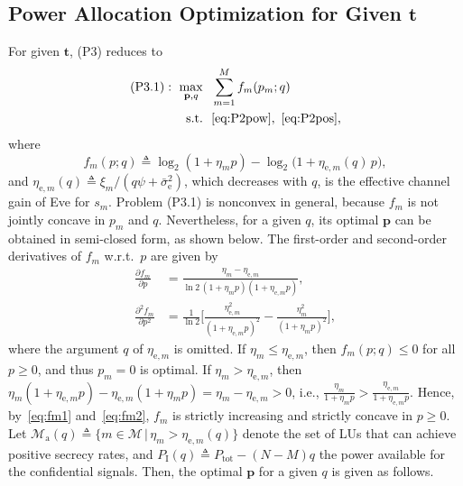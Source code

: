 \documentclass[journal]{IEEEtran}
\newcommand{\bt}{\mathbf{t}}
\newcommand{\bp}{\mathbf{p}}
\newcommand{\Ptot}{P_{\mathrm{tot}}}
\newcommand{\sbe}{\bar{\sigma}_{\mathrm{e}}^2}
\begin{document}
\subsection{Power Allocation Optimization for Given $\bt$}\label{sec:power}

For given $\bt$, (P3) reduces to
\begin{subequations}\label{eq:P31}
\begin{align}
(\mathrm{P3.1}):\ \max_{\bp,q}\ \ & \sum_{m=1}^{M}f_m(p_m;q)\\
\mathrm{s.t.}\ \ & \eqref{eq:P2pow},\ \eqref{eq:P2pos},\nonumber
\end{align}
\end{subequations}
where
\begin{equation}\label{eq:fm}
f_m(p;q)\triangleq\log_2(1+\eta_mp)-\log_2\big(1+\eta_{\mathrm{e},m}(q)\,p\big),
\end{equation}
and $\eta_{\mathrm{e},m}(q)\triangleq\xi_m/(q\psi+\sbe)$, which decreases with $q$, is the effective channel gain of Eve for $s_m$. Problem (P3.1) is nonconvex in general, because $f_m$ is not jointly concave in $p_m$ and $q$. Nevertheless, for a given $q$, its optimal $\bp$ can be obtained in semi-closed form, as shown below. The first-order and second-order derivatives of $f_m$ w.r.t.\ $p$ are given by
\begin{align}
\frac{\partial f_m}{\partial p}&=\frac{\eta_m-\eta_{\mathrm{e},m}}{\ln2\,(1+\eta_mp)(1+\eta_{\mathrm{e},m}p)},\label{eq:fm1}\\
\frac{\partial^2 f_m}{\partial p^2}&=\frac{1}{\ln2}\bigg[\frac{\eta_{\mathrm{e},m}^2}{(1+\eta_{\mathrm{e},m}p)^2}-\frac{\eta_m^2}{(1+\eta_mp)^2}\bigg],\label{eq:fm2}
\end{align}
where the argument $q$ of $\eta_{\mathrm{e},m}$ is omitted. If $\eta_m\le\eta_{\mathrm{e},m}$, then $f_m(p;q)\le0$ for all $p\ge0$, and thus $p_m=0$ is optimal. If $\eta_m>\eta_{\mathrm{e},m}$, then $\eta_m(1+\eta_{\mathrm{e},m}p)-\eta_{\mathrm{e},m}(1+\eta_mp)=\eta_m-\eta_{\mathrm{e},m}>0$, i.e., $\frac{\eta_m}{1+\eta_mp}>\frac{\eta_{\mathrm{e},m}}{1+\eta_{\mathrm{e},m}p}$. Hence, by~\eqref{eq:fm1} and~\eqref{eq:fm2}, $f_m$ is strictly increasing and strictly concave in $p\ge0$. Let $\mathcal M_{\mathrm a}(q)\triangleq\{m\in\mathcal M\,|\,\eta_m>\eta_{\mathrm{e},m}(q)\}$ denote the set of LUs that can achieve positive secrecy rates, and $P_{\mathrm I}(q)\triangleq\Ptot-(N-M)q$ the power available for the confidential signals. Then, the optimal $\bp$ for a given $q$ is given as follows.
\end{document}
